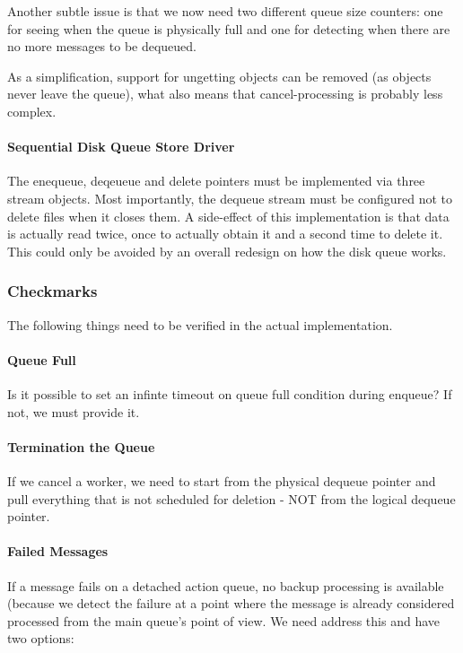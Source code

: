 \documentclass[a4paper,10pt]{article}
\begin{document}
Another subtle issue is that we now need two different queue size counters: one for seeing when the queue is physically full and one for detecting when there are no more messages to be dequeued.

As a simplification, support for ungetting objects can be removed (as objects never leave the queue), what also means that cancel-processing is probably less complex.

\paragraph{Sequential Disk Queue Store Driver}
The enequeue, deqeueue and delete pointers must be implemented via three stream objects. Most importantly, the dequeue stream must be configured not to delete files when it closes them. A side-effect of this implementation is that data is actually read twice, once to actually obtain it and a second time to delete it. This could only be avoided by an overall redesign on how the disk queue works.

\subsubsection{Checkmarks}
The following things need to be verified in the actual implementation.

\paragraph{Queue Full}
Is it possible to set an infinte timeout on queue full condition during enqueue? If not, we must provide it.

\paragraph{Termination the Queue}
If we cancel a worker, we need to start from the physical dequeue pointer and pull everything that is not scheduled for deletion - NOT from the logical dequeue pointer.

\paragraph{Failed Messages}
If a message fails on a detached action queue, no backup processing is available (because we detect the failure at a point where the message is already considered processed from the main queue's point of view. We need address this and have two options:
\end{document}
